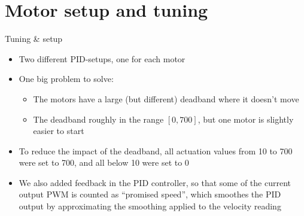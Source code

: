 \documentclass[12pt]{beamer}
\begin{document}
\section{Motor setup and tuning}
\begin{frame}{Tuning \& setup}
  \begin{itemize}
  \item<+-> Two different PID-setups, one for each motor
  \item<+-> One big problem to solve:
    \begin{itemize}
       \item<+-> The motors have a large (but different) deadband where it doesn't move
      \item<+->[$\Rightarrow$] The deadband roughly in the range $\left[0,700\right]$, but one motor is slightly easier to start
   \end{itemize}
 \item<+-> To reduce the impact of the deadband, all actuation values from 10 to 700 were set to 700, and all below 10 were set to 0
   \item<+-> We also added feedback in the PID controller, so that some of the current output PWM is counted as ``promised speed'', which smoothes the PID output by approximating the smoothing applied to the velocity reading
  \end{itemize}
  
\end{frame}
\end{document}
